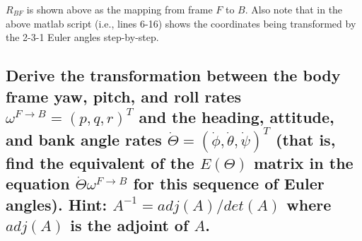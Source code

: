 \documentclass{article}
\begin{document}
$R_{BF}$ is shown above as the mapping from frame $F$ to $B$. Also note that in the above matlab script (i.e., lines 6-16) shows the coordinates being transformed by the 2-3-1 Euler angles step-by-step.

\subsection{Derive the transformation between the body frame yaw, pitch, and roll rates $\omega^{F \to B} = ( p, q, r )^T$ and the heading, attitude, and bank angle rates $\dot{\Theta} = (\dot{\phi}, \dot{\theta}, \dot{\psi})^T$ (that is, find the equivalent of the $E(\Theta )$ matrix in the equation $\dot{\Theta} \omega^{F \to B}$ for this sequence of Euler angles). Hint: $A^{-1} = adj(A) / det(A)$ where $adj(A)$ is the adjoint of $A$.}
\end{document}
